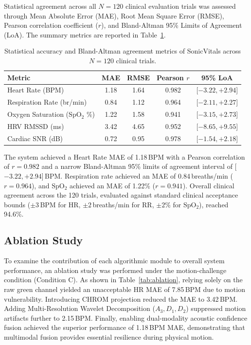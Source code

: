 \documentclass[journal]{IEEEtran}
\begin{document}
Statistical agreement across all $N=120$ clinical evaluation trials was assessed through Mean Absolute Error (MAE), Root Mean Square Error (RMSE), Pearson correlation coefficient ($r$), and Bland-Altman 95\% Limits of Agreement (LoA). The summary metrics are reported in Table~\ref{tab:statistical_metrics}.

\begin{table}[!t]
    \centering
    \caption{Statistical accuracy and Bland-Altman agreement metrics of SonicVitals across $N=120$ clinical trials.}
    \label{tab:statistical_metrics}
    \footnotesize
    \renewcommand{\arraystretch}{0.92}
    \setlength{\tabcolsep}{2.0pt}
    \begin{tabular}{lcccc}
        \toprule
        \textbf{Metric} & \textbf{MAE} & \textbf{RMSE} & \textbf{Pearson $r$} & \textbf{95\% LoA} \\
        \midrule
        Heart Rate (BPM) & 1.18 & 1.64 & 0.982 & [$-3.22, +2.94$] \\
        Respiration Rate (br/min) & 0.84 & 1.12 & 0.964 & [$-2.11, +2.27$] \\
        Oxygen Saturation ($\mathrm{SpO_2}$ \%) & 1.22 & 1.58 & 0.941 & [$-3.15, +2.73$] \\
        HRV RMSSD (ms) & 3.42 & 4.65 & 0.952 & [$-8.65, +9.55$] \\
        Cardiac SNR (dB) & 0.72 & 0.95 & 0.978 & [$-1.54, +2.18$] \\
        \bottomrule
    \end{tabular}
\end{table}

The system achieved a Heart Rate MAE of 1.18\,BPM with a Pearson correlation of $r = 0.982$ and a narrow Bland-Altman 95\% limits of agreement interval of [$-3.22, +2.94$]\,BPM. Respiration rate achieved an MAE of 0.84\,breaths/min ($r = 0.964$), and $\mathrm{SpO_2}$ achieved an MAE of 1.22\% ($r = 0.941$). Overall clinical agreement across the 120 trials, evaluated against standard clinical acceptance bounds ($\pm 3$\,BPM for HR, $\pm 2$\,breaths/min for RR, $\pm 2$\% for $\mathrm{SpO_2}$), reached 94.6\%.

\subsection{Ablation Study}

To examine the contribution of each algorithmic module to overall system performance, an ablation study was performed under the motion-challenge condition (Condition C). As shown in Table~\ref{tab:ablation}, relying solely on the raw green channel yielded an unacceptable HR MAE of 7.85\,BPM due to motion vulnerability. Introducing CHROM projection reduced the MAE to 3.42\,BPM. Adding Multi-Resolution Wavelet Decomposition ($A_3, D_1, D_2$) suppressed motion artifacts further to 2.15\,BPM. Finally, enabling dual-modality acoustic confidence fusion achieved the superior performance of 1.18\,BPM MAE, demonstrating that multimodal fusion provides essential resilience during physical motion.
\end{document}
